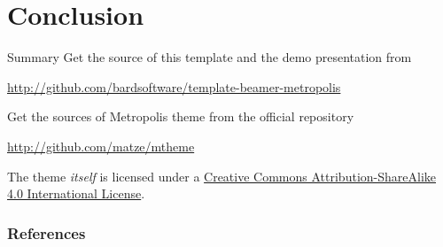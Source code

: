 \documentclass[12pt]{beamer}
\begin{document}

\section{Conclusion}

\begin{frame}{Summary}
Get the source of this template and the demo presentation from

\begin{center}\url{http://github.com/bardsoftware/template-beamer-metropolis}\end{center}

Get the sources of Metropolis theme from the official repository

  \begin{center}\url{http://github.com/matze/mtheme}\end{center}

The theme \emph{itself} is licensed under a
\href{http://creativecommons.org/licenses/by-sa/4.0/}{Creative Commons
Attribution-ShareAlike 4.0 International License}.

\begin{center}\ccbysa\end{center}

\end{frame}


\begin{frame}[allowframebreaks]
\frametitle{References}
\nocite{*}



\end{frame}
\end{document}
